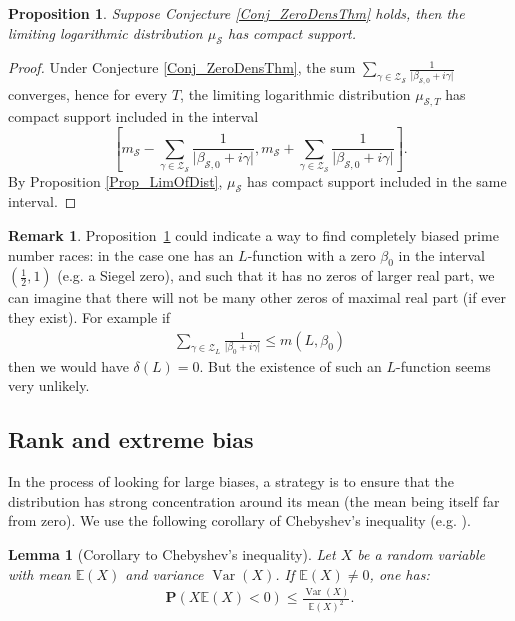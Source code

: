 \documentclass[a4paper,10pt]{amsart}
\theoremstyle{plain}
\newtheorem{prop}[theo]{Proposition}
\newtheorem{lem}[theo]{Lemma}
\theoremstyle{definition}
\newtheorem{Rk}{Remark}
\begin{document}
\begin{prop}\label{Prop_noRH_CompactSupp}
	Suppose Conjecture \ref{Conj_ZeroDensThm} holds,
	then the limiting logarithmic distribution $\mu_{\mathcal{S}}$ has compact support.
\end{prop}

\begin{proof}
	Under Conjecture \ref{Conj_ZeroDensThm}, the sum $\sum_{\gamma \in \mathcal{Z}_{\mathcal{S}}}\frac{1}{\lvert \beta_{\mathcal{S},0} + i\gamma\rvert}$ converges,
	hence for every $T$, the limiting logarithmic distribution $\mu_{\mathcal{S},T}$ has compact support included in the interval 
	$$\left[m_{\mathcal{S}}- \sum_{\gamma \in \mathcal{Z}_{\mathcal{S}}}\frac{1}{\lvert \beta_{\mathcal{S},0} + i\gamma\rvert} , m_{\mathcal{S}}+ \sum_{\gamma \in \mathcal{Z}_{\mathcal{S}}}\frac{1}{\lvert \beta_{\mathcal{S},0} + i\gamma\rvert}\right].$$
	By Proposition \ref{Prop_LimOfDist}, $\mu_{\mathcal{S}}$ has compact support included in the same interval.	
\end{proof}

\begin{Rk}
Proposition~\ref{Prop_noRH_CompactSupp} could indicate a way to find completely biased prime number races: 
in the case one has an $L$-function with a zero $\beta_{0}$ in the interval $\left(\frac{1}{2},1\right)$ (e.g. a Siegel zero), 
and such that it has no zeros of larger real part,
we can imagine that there will not be many other zeros of maximal real part (if ever they exist). 
For example if
\begin{align*}
\sum_{\gamma \in\mathcal{Z}_{L}}\frac{1}{\lvert \beta_{0}+i\gamma\rvert} \leq m(L,\beta_{0})
\end{align*}
then we would have $\delta(L) = 0$.
But the existence of such an $L$-function seems very unlikely.
\end{Rk}

\subsection{Rank and extreme bias}\label{sub_ChebInequality}

In the process of looking for large biases, a strategy is to ensure that the distribution has 
strong concentration around its mean (the mean being itself far from zero).
We use the following corollary of Chebyshev's inequality (e.g. \cite[Prop. (1.2)]{Bass}).

\begin{lem}[Corollary to Chebyshev's inequality]\label{Lem_ChebyshevIneq}
	Let $X$ be a random variable with mean $\mathbb{E}(X)$ and variance $\operatorname{Var}(X)$.
 If $\mathbb{E}(X)\neq 0$, one has:
\begin{align}\label{ChebyshevInequality}
\mathbf{P}(X\mathbb{E}(X) <0)\leq \frac{\operatorname{Var}(X)}{\mathbb{E}(X)^{2}}.
\end{align}
\end{lem}
\end{document}
